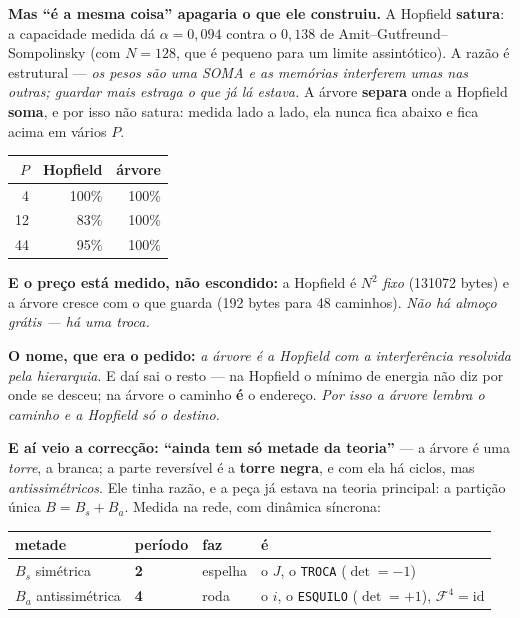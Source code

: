 \documentclass[11pt]{article}
\newcommand{\code}[1]{\texttt{\small #1}}
\theoremstyle{plain}
\theoremstyle{remark}
\begin{document}
\begin{itemize}
\textbf{Mas ``é a mesma coisa'' apagaria o que ele construiu.} A Hopfield \textbf{satura}: a
capacidade medida dá $\alpha = 0{,}094$ contra o $0{,}138$ de Amit--Gutfreund--Sompolinsky (com
$N=128$, que é pequeno para um limite assintótico). A razão é estrutural --- \emph{os pesos são uma
SOMA e as memórias interferem umas nas outras; guardar mais estraga o que já lá estava.} A árvore
\textbf{separa} onde a Hopfield \textbf{soma}, e por isso não satura: medida lado a lado, ela nunca
fica abaixo e fica acima em vários $P$.

\begin{center}
\begin{tabular}{rrr}
\toprule
$P$ & Hopfield & árvore \\
\midrule
 4 & 100\% & 100\% \\
12 & 83\% & 100\% \\
44 & 95\% & 100\% \\
\bottomrule
\end{tabular}
\end{center}

\textbf{E o preço está medido, não escondido:} a Hopfield é $N^2$ \emph{fixo} (131072 bytes) e a
árvore cresce com o que guarda (192 bytes para 48 caminhos). \emph{Não há almoço grátis --- há uma
troca.}

\textbf{O nome, que era o pedido:} \emph{a árvore é a Hopfield com a interferência resolvida pela
hierarquia}. E daí sai o resto --- na Hopfield o mínimo de energia não diz por onde se desceu; na
árvore o caminho \textbf{é} o endereço. \emph{Por isso a árvore lembra o caminho e a Hopfield só o
destino.}

\textbf{E aí veio a correcção: ``ainda tem só metade da teoria''} --- a árvore é uma \emph{torre}, a
branca; a parte reversível é a \textbf{torre negra}, e com ela há ciclos, mas \emph{antissimétricos}.
Ele tinha razão, e a peça já estava na teoria principal: a partição única $B = B_s + B_a$. Medida na
rede, com dinâmica síncrona:

\begin{center}
\begin{tabular}{llll}
\toprule
metade & período & faz & é \\
\midrule
$B_s$ simétrica & \textbf{2} & espelha & o $J$, o \code{TROCA} ($\det=-1$) \\
$B_a$ antissimétrica & \textbf{4} & roda & o $i$, o \code{ESQUILO} ($\det=+1$), $\mathcal{F}^4=\mathrm{id}$ \\
\bottomrule
\end{tabular}
\end{center}


\end{itemize}
\end{document}
